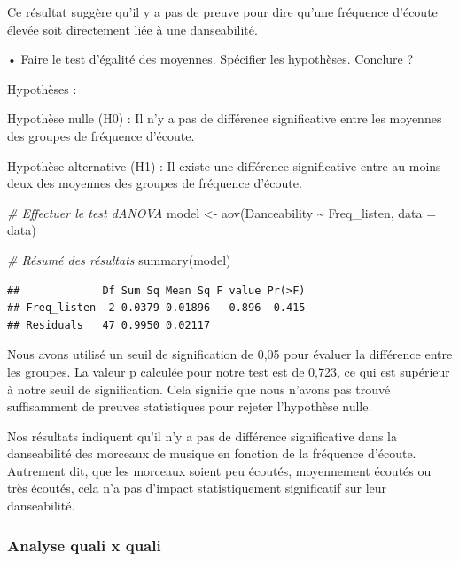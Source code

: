 \documentclass[
]{article}
\newenvironment{Shaded}{\begin{snugshade}}{\end{snugshade}}
\newcommand{\AttributeTok}[1]{\textcolor[rgb]{0.77,0.63,0.00}{#1}}
\newcommand{\CommentTok}[1]{\textcolor[rgb]{0.56,0.35,0.01}{\textit{#1}}}
\newcommand{\FunctionTok}[1]{\textcolor[rgb]{0.00,0.00,0.00}{#1}}
\newcommand{\NormalTok}[1]{#1}
\newcommand{\OtherTok}[1]{\textcolor[rgb]{0.56,0.35,0.01}{#1}}
\newcommand{\SpecialCharTok}[1]{\textcolor[rgb]{0.00,0.00,0.00}{#1}}
\begin{document}
Ce résultat suggère qu'il y a pas de preuve pour dire qu'une fréquence
d'écoute élevée soit directement liée à une danseabilité.

• Faire le test d'égalité des moyennes. Spécifier les hypothèses.
Conclure ?

Hypothèses :

Hypothèse nulle (H0) : Il n'y a pas de différence significative entre
les moyennes des groupes de fréquence d'écoute.

Hypothèse alternative (H1) : Il existe une différence significative
entre au moins deux des moyennes des groupes de fréquence d'écoute.

\begin{Shaded}
\begin{Highlighting}[]
\CommentTok{\# Effectuer le test d\textquotesingle{}ANOVA}
\NormalTok{model }\OtherTok{\textless{}{-}} \FunctionTok{aov}\NormalTok{(Danceability }\SpecialCharTok{\textasciitilde{}}\NormalTok{ Freq\_listen, }\AttributeTok{data =}\NormalTok{ data)}

\CommentTok{\# Résumé des résultats}
\FunctionTok{summary}\NormalTok{(model)}
\end{Highlighting}
\end{Shaded}

\begin{verbatim}
##             Df Sum Sq Mean Sq F value Pr(>F)
## Freq_listen  2 0.0379 0.01896   0.896  0.415
## Residuals   47 0.9950 0.02117
\end{verbatim}

Nous avons utilisé un seuil de signification de 0,05 pour évaluer la
différence entre les groupes. La valeur p calculée pour notre test est
de 0,723, ce qui est supérieur à notre seuil de signification. Cela
signifie que nous n'avons pas trouvé suffisamment de preuves
statistiques pour rejeter l'hypothèse nulle.

Nos résultats indiquent qu'il n'y a pas de différence significative dans
la danseabilité des morceaux de musique en fonction de la fréquence
d'écoute. Autrement dit, que les morceaux soient peu écoutés,
moyennement écoutés ou très écoutés, cela n'a pas d'impact
statistiquement significatif sur leur danseabilité.

\hypertarget{analyse-quali-x-quali}{%
\subsubsection{Analyse quali x quali}\label{analyse-quali-x-quali}}
\end{document}
